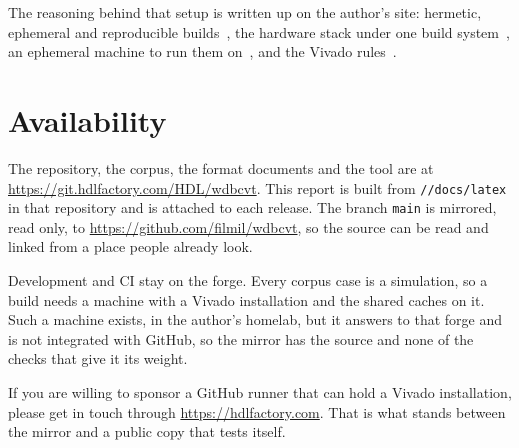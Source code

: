 The reasoning behind that setup is written up on the author's site:
hermetic, ephemeral and reproducible builds~\cite{her}, the hardware
stack under one build system~\cite{btd}, an ephemeral machine to run
them on~\cite{homelab}, and the Vivado rules~\cite{rulesvivado}.

\section*{Availability}

The repository, the corpus, the format documents and the tool are at
\url{https://git.hdlfactory.com/HDL/wdbcvt}. This report is built from
\texttt{//docs/latex} in that repository and is attached to each
release. The branch \texttt{main} is mirrored, read only, to
\url{https://github.com/filmil/wdbcvt}, so the source can be read and
linked from a place people already look.

Development and CI stay on the forge. Every corpus case is a
simulation, so a build needs a machine with a Vivado installation and
the shared caches on it. Such a machine exists, in the author's
homelab, but it answers to that forge and is not integrated with
GitHub, so the mirror has the source and none of the checks that give
it its weight.

If you are willing to sponsor a GitHub runner that can hold a Vivado
installation, please get in touch through
\url{https://hdlfactory.com}. That is what stands between the mirror
and a public copy that tests itself.
